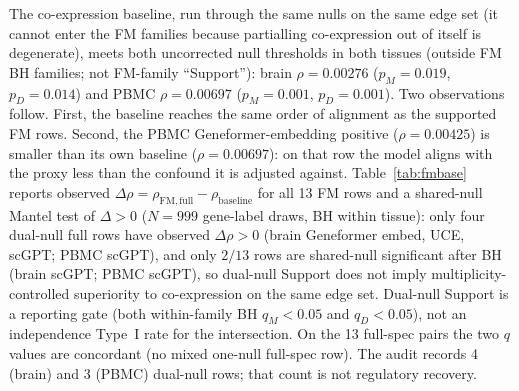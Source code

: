 \documentclass[fleqn,10pt,lineno]{wlpeerj}
\begin{document}
The co-expression baseline, run through the same nulls on the same edge set (it cannot enter the
FM families because partialling co-expression out of itself is degenerate), meets both uncorrected
null thresholds in both tissues (outside FM BH families; not FM-family ``Support''): brain
$\rho=0.00276$ ($p_M=0.019$, $p_D=0.014$) and PBMC $\rho=0.00697$
($p_M=0.001$, $p_D=0.001$). Two observations follow. First, the baseline reaches the same order of
alignment as the supported FM rows. Second, the PBMC Geneformer-embedding positive
($\rho=0.00425$) is smaller than its own baseline ($\rho=0.00697$): on that row the model aligns
with the proxy less than the confound it is adjusted against.
Table~\ref{tab:fmbase} reports observed
$\Delta\rho=\rho_{\mathrm{FM,full}}-\rho_{\mathrm{baseline}}$ for all 13 FM rows and a shared-null
Mantel test of $\Delta>0$ ($N{=}999$ gene-label draws, BH within tissue):
only four dual-null full rows have observed $\Delta\rho>0$
(brain Geneformer embed, UCE, scGPT; PBMC scGPT), and only
$2/13$ rows are shared-null significant after BH (brain scGPT; PBMC scGPT), so dual-null Support
does not imply multiplicity-controlled superiority to co-expression on the same edge set.
Dual-null Support is a reporting gate (both within-family BH $q_M<0.05$ and $q_D<0.05$), not an
independence Type~I rate for the intersection. On the 13 full-spec pairs the two $q$ values are
concordant (no mixed one-null full-spec row). The audit records 4 (brain) and 3 (PBMC) dual-null
rows; that count is not regulatory recovery.

\begin{table}[H]\centering
\resizebox{\linewidth}{!}{}
\caption{FM versus same-edge co-expression baseline under the full confound design.
The $\rho_{\mathrm{FM}}$ column is a shared-null recompute of the primary partial Spearman
printed in Table~\ref{tab:primary}; that table is the only primary $\rho$.
Small differences from the primary fixed-panel $\rho_{\mathrm{spec}}$ values
reflect that recompute, not a second primary estimand.
$\Delta\rho=\rho_{\mathrm{FM}}-\rho_{\mathrm{base}}$ is the observed contrast; $q_{\Delta}$ and
Shared sig are one-sided shared-null Mantel tests of $\Delta>0$ ($N{=}999$, BH within tissue).
Dual-null is the primary Support gate (both within-family BH $q_M<0.05$ and $q_D<0.05$). Dual$\wedge\Delta{>}0$ counts rows that are
dual-null \emph{and} have observed $\Delta\rho>0$ ($4/7$ dual-null rows; $4/13$ FM rows overall);
shared-null significance is $2/13$ (brain/PBMC scGPT only).}\label{tab:fmbase}
\end{table}
\end{document}
